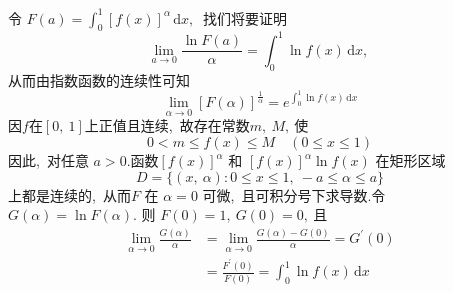	\begin{solution}
		令 $ F(a)=\int_{0}^{1}[f(x)]^{\alpha} \,\text{d} x ,\ $ 找们将要证明
		$$\lim\limits_{a \rightarrow 0} \frac{\ln F(a)}{\alpha}=\int_{0}^{1} \ln f(x) \,\text{d} x ,\ $$
		从而由指数函数的连续性可知
		$$\lim\limits_{\alpha \rightarrow 0}[F(\alpha)]^{\frac{1}{\alpha}}=e^{\int_{0}^{1} \ln f(x) \,\text{d} x}$$
		因$f$在$\left[0,\ 1\right]$上正值且连续,\ 故存在常数$m,\ M,\ $使
		$$0<m \leqslant f(x) \leqslant M \quad(0 \leqslant x \leqslant 1)$$
		因此,\  对任意 $ a>0 . $函数$  [f(x)]^{\alpha}$  和  $[f(x)]^{\alpha} \ln f(x) $ 在矩形区域
		$$D=\{(x,\  \alpha): 0 \leqslant x \leqslant 1,\ -a \leqslant\alpha \leqslant a\}$$
		上都是连续的,\  从而$  F $ 在  $\alpha=0 $ 可微,\ 且可积分号下求导数.令$G(\alpha)=\ln F(\alpha) .$ 则 $ F(0)=1,\  G(0)=0 ,\  $且
		$$\begin{aligned}
			\lim\limits_{\alpha \rightarrow 0} \frac{G(\alpha)}{\alpha} &=\lim\limits_{\alpha \rightarrow 0} \frac{G(\alpha)-G(0)}{\alpha}=G^{\prime}(0) \\
			&=\frac{F^{\prime}(0)}{F(0)}=\int_{0}^{1} \ln f(x) \,\text{d} x
		\end{aligned}$$ 
	\end{solution}